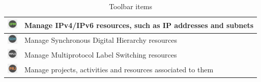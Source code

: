 \documentclass[a4paper]{article}
\begin{document}
\begin{table}[h!]
\begin{tabular}{cl}
			\midrule
			\includegraphics[width=0.5cm]{img/icon_IPAM_manager.png} & Manage IPv4/IPv6 resources, such as IP addresses and subnets\\
			\midrule
			\includegraphics[width=0.5cm]{img/icon_SDH_networks.png} & Manage Synchronous Digital Hierarchy resources\\
			\midrule
			\includegraphics[width=0.5cm]{img/icon_MPLS_mudule.png} & Manage Multiprotocol Label Switching resources\\
			\midrule
			\includegraphics[width=0.5cm]{img/icon_projects.png} & Manage projects, activities and resources associated to them\\
		\end{tabular}	
		\caption{Toolbar items}
		\label{tab:toolbar_icons}
	\end{table}
		
	\clearpage
\end{document}
